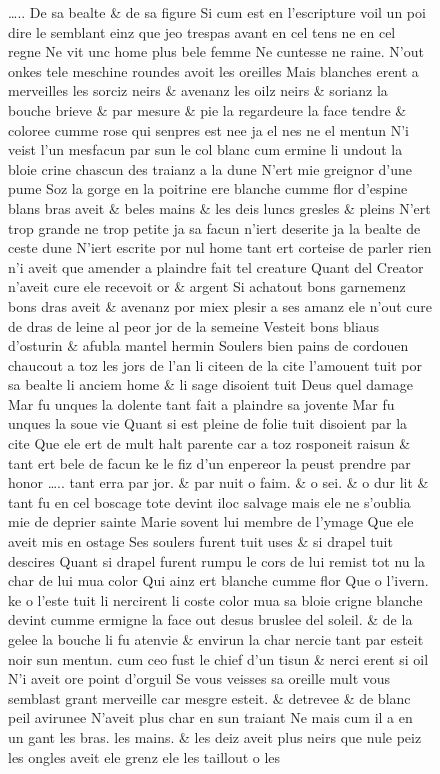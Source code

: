 \documentclass[
  letterpaper,
  DIV=11,
  numbers=noendperiod,
  oneside]{scrreprt}
\begin{document}
\begin{figure}
\ldots.. De sa bealte \& de sa figure Si cum est en l'escripture voil un
poi dire le semblant einz que jeo trespas avant en cel tens ne en cel
regne Ne vit unc home plus bele femme Ne cuntesse ne raine. N'out onkes
tele meschine roundes avoit les oreilles Mais blanches erent a
merveilles les sorciz neirs \& avenanz les oilz neirs \& sorianz la
bouche brieve \& par mesure \& pie la regardeure la face tendre \&
coloree cumme rose qui senpres est nee ja el nes ne el mentun N'i veist
l'un mesfacun par sun le col blanc cum ermine li undout la bloie crine
chascun des traianz a la dune N'ert mie greignor d'une pume Soz la gorge
en la poitrine ere blanche cumme flor d'espine blans bras aveit \& beles
mains \& les deis luncs gresles \& pleins N'ert trop grande ne trop
petite ja sa facun n'iert deserite ja la bealte de ceste dune N'iert
escrite por nul home tant ert corteise de parler rien n'i aveit que
amender a plaindre fait tel creature Quant del Creator n'aveit cure ele
recevoit or \& argent Si achatout bons garnemenz bons dras aveit \&
avenanz por miex plesir a ses amanz ele n'out cure de dras de leine al
peor jor de la semeine Vesteit bons bliaus d'osturin \& afubla mantel
hermin Soulers bien pains de cordouen chaucout a toz les jors de l'an li
citeen de la cite l'amouent tuit por sa bealte li anciem home \& li sage
disoient tuit Deus quel damage Mar fu unques la dolente tant fait a
plaindre sa jovente Mar fu unques la soue vie Quant si est pleine de
folie tuit disoient par la cite Que ele ert de mult halt parente car a
toz rosponeit raisun \& tant ert bele de facun ke le fiz d'un enpereor
la peust prendre par honor \ldots.. tant erra par jor. \& par nuit o
faim. \& o sei. \& o dur lit \& tant fu en cel boscage tote devint iloc
salvage mais ele ne s'oublia mie de deprier sainte Marie sovent lui
membre de l'ymage Que ele aveit mis en ostage Ses soulers furent tuit
uses \& si drapel tuit descires Quant si drapel furent rumpu le cors de
lui remist tot nu la char de lui mua color Qui ainz ert blanche cumme
flor Que o l'ivern. ke o l'este tuit li nercirent li coste color mua sa
bloie crigne blanche devint cumme ermigne la face out desus bruslee del
soleil. \& de la gelee la bouche li fu atenvie \& envirun la char nercie
tant par esteit noir sun mentun. cum ceo fust le chief d'un tisun \&
nerci erent si oil N'i aveit ore point d'orguil Se vous veisses sa
oreille mult vous semblast grant merveille car mesgre esteit. \&
detrevee \& de blanc peil avirunee N'aveit plus char en sun traiant Ne
mais cum il a en un gant les bras. les mains. \& les deiz aveit plus
neirs que nule peiz les ongles aveit ele grenz ele les taillout o les

\end{figure}
\end{document}
